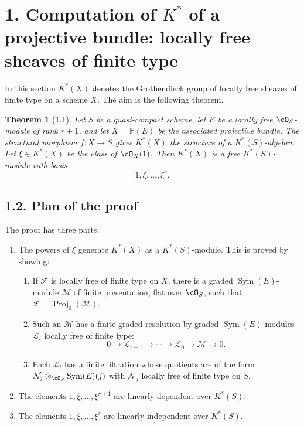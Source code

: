 \documentclass[11pt]{article}
\theoremstyle{plain}
\newtheorem{theorem}{Theorem}[section]
\theoremstyle{definition}
\theoremstyle{remark}
\DeclareMathOperator{\Proj}{Proj}
\providecommand{\Sym}{\operatorname{Sym}}
\begin{document}
\section*{1. Computation of $K^*$ of a projective bundle: locally free sheaves of finite type}

In this section $K^*(X)$ denotes the Grothendieck group of locally free sheaves of finite type on a scheme $X$. The aim is the following theorem.

\begin{theorem}[1.1]\label{thm:VI.1.1}
Let $S$ be a quasi-compact scheme, let $E$ be a locally free $\cO_S$-module of rank $r+1$, and let $X=\mathbb P(E)$ be the associated projective bundle. The structural morphism $f:X\to S$ gives $K^*(X)$ the structure of a $K^*(S)$-algebra. Let $\xi\in K^*(X)$ be the class of $\cO_X(1)$. Then $K^*(X)$ is a free $K^*(S)$-module with basis
\[
1,\xi,\ldots,\xi^r.
\]
\end{theorem}

\subsection*{1.2. Plan of the proof}
The proof has three parts.
\begin{enumerate}[label=$\arabic*^\circ$)]
\item The powers of $\xi$ generate $K^*(X)$ as a $K^*(S)$-module. This is proved by showing:
\begin{enumerate}[label=(\alph*)]
\item If $\mathcal F$ is locally free of finite type on $X$, there is a graded $\Sym(E)$-module $\mathcal M$ of finite presentation, flat over $\cO_S$, such that $\mathcal F=\Proj_0(\mathcal M)$.
\item Such an $\mathcal M$ has a finite graded resolution by graded $\Sym(E)$-modules $\mathcal L_i$ locally free of finite type:
\[
0\to \mathcal L_{r+1}\to\cdots\to \mathcal L_0\to\mathcal M\to 0.
\]
\item Each $\mathcal L_i$ has a finite filtration whose quotients are of the form $\mathcal N_j\otimes_{\cO_S}\Sym(E)(j)$ with $\mathcal N_j$ locally free of finite type on $S$.
\end{enumerate}
\item The elements $1,\xi,\ldots,\xi^{r+1}$ are linearly dependent over $K^*(S)$.
\item The elements $1,\xi,\ldots,\xi^r$ are linearly independent over $K^*(S)$.
\end{enumerate}
\end{document}
